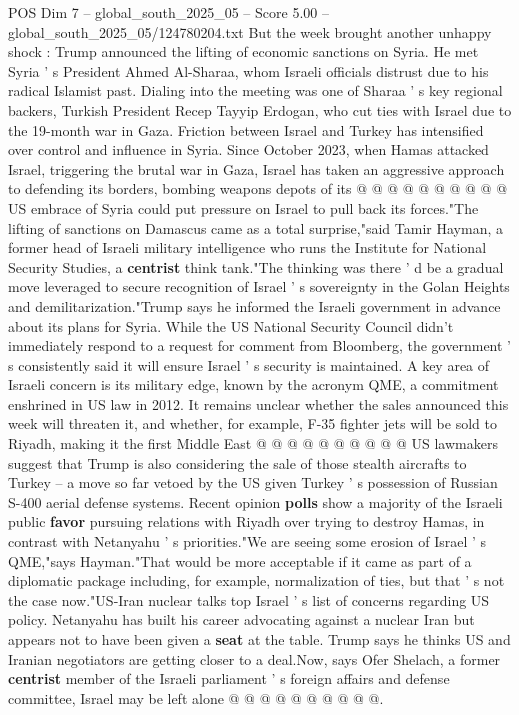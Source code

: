 \begin{textsample}{POS Dim 7 – global\_south\_2025\_05 – Score 5.00 – global\_south\_2025\_05/124780204.txt}
But the week brought another unhappy shock : Trump announced the lifting of economic sanctions on Syria.
He met Syria ' s President Ahmed Al-Sharaa, whom Israeli officials distrust due to his radical Islamist past.
Dialing into the meeting was one of Sharaa ' s key regional backers, Turkish President Recep Tayyip Erdogan, who cut ties with Israel due to the 19-month war in Gaza.
Friction between Israel and Turkey has intensified over control and influence in Syria.
Since October 2023, when Hamas attacked Israel, triggering the brutal war in Gaza, Israel has taken an aggressive approach to defending its borders, bombing weapons depots of its @ @ @ @ @ @ @ @ @ @ US embrace of Syria could put pressure on Israel to pull back its forces."The lifting of sanctions on Damascus came as a total surprise,"said Tamir Hayman, a former head of Israeli military intelligence who runs the Institute for National Security Studies, a \textbf{centrist} think tank."The thinking was there ' d be a gradual move leveraged to secure recognition of Israel ' s sovereignty in the Golan Heights and demilitarization."Trump says he informed the Israeli government in advance about its plans for Syria.
While the US National Security Council didn't immediately respond to a request for comment from Bloomberg, the government ' s consistently said it will ensure Israel ' s security is maintained.
A key area of Israeli concern is its military edge, known by the acronym QME, a commitment enshrined in US law in 2012.
It remains unclear whether the sales announced this week will threaten it, and whether, for example, F-35 fighter jets will be sold to Riyadh, making it the first Middle East @ @ @ @ @ @ @ @ @ @ US lawmakers suggest that Trump is also considering the sale of those stealth aircrafts to Turkey -- a move so far vetoed by the US given Turkey ' s possession of Russian S-400 aerial defense systems.
Recent opinion \textbf{polls} show a majority of the Israeli public \textbf{favor} pursuing relations with Riyadh over trying to destroy Hamas, in contrast with Netanyahu ' s priorities."We are seeing some erosion of Israel ' s QME,"says Hayman."That would be more acceptable if it came as part of a diplomatic package including, for example, normalization of ties, but that ' s not the case now."US-Iran nuclear talks top Israel ' s list of concerns regarding US policy.
Netanyahu has built his career advocating against a nuclear Iran but appears not to have been given a \textbf{seat} at the table.
Trump says he thinks US and Iranian negotiators are getting closer to a deal.Now, says Ofer Shelach, a former \textbf{centrist} member of the Israeli parliament ' s foreign affairs and defense committee, Israel may be left alone @ @ @ @ @ @ @ @ @ @.

\end{textsample}
